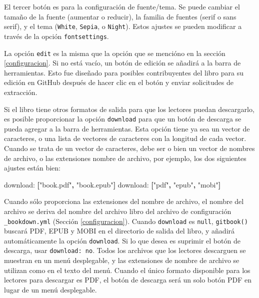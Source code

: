 \documentclass[12pt,]{krantz}
\makeatletter
\newenvironment{Shaded}{\begin{snugshade}}{\end{snugshade}}
\newcommand{\KeywordTok}[1]{\textcolor[rgb]{0.13,0.29,0.53}{\textbf{{#1}}}}
\newcommand{\StringTok}[1]{\textcolor[rgb]{0.31,0.60,0.02}{{#1}}}
\newcommand{\FunctionTok}[1]{\textcolor[rgb]{0.00,0.00,0.00}{{#1}}}
\newenvironment{kframe}{%
\medskip{}
\setlength{\fboxsep}{.8em}
 \def\at@end@of@kframe{}%
 \ifinner\ifhmode%
  \def\at@end@of@kframe{\end{minipage}}%
  \begin{minipage}{\columnwidth}%
 \fi\fi%
 \def\FrameCommand##1{\hskip\@totalleftmargin \hskip-\fboxsep
 \colorbox{shadecolor}{##1}\hskip-\fboxsep
     \hskip-\linewidth \hskip-\@totalleftmargin \hskip\columnwidth}%
 \MakeFramed {\advance\hsize-\width
   \@totalleftmargin\z@ \linewidth\hsize
   \@setminipage}}%
 {\par\unskip\endMakeFramed%
 \at@end@of@kframe}
\renewenvironment{Shaded}{\begin{kframe}}{\end{kframe}}
\theoremstyle{definition}
\theoremstyle{definition}
\theoremstyle{remark}
\makeatother
\begin{document}
El tercer botón es para la configuración de fuente/tema. Se puede
cambiar el tamaño de la fuente (aumentar o reducir), la familia de
fuentes (serif o sans serif), y el tema (\texttt{White}, \texttt{Sepia},
o \texttt{Night}). Estos ajustes se pueden modificar a través de la
opción \texttt{fontsettings}.

La opción \texttt{edit} es la misma que la opción que se mencióno en la
sección \ref{configuracion}. Si no está vacío, un botón de edición se
añadirá a la barra de herramientas. Esto fue diseñado para posibles
contribuyentes del libro para su edición en GitHub después de hacer clic
en el botón y enviar solicitudes de extracción.

Si el libro tiene otros formatos de salida para que los lectores puedan
descargarlo, es posible proporcionar la opción \texttt{download} para
que un botón de descarga se pueda agregar a la barra de herramientas.
Esta opción tiene ya sea un vector de caracteres, o una lista de
vectores de caracteres con la longitud de cada vector. Cuando se trata
de un vector de caracteres, debe ser o bien un vector de nombres de
archivo, o las extensiones nombre de archivo, por ejemplo, los dos
siguientes ajustes están bien:

\begin{Shaded}
\begin{Highlighting}[]
    \FunctionTok{download:} \KeywordTok{[}\StringTok{"book.pdf"}\KeywordTok{,} \StringTok{"book.epub"}\KeywordTok{]}
    \FunctionTok{download:} \KeywordTok{[}\StringTok{"pdf"}\KeywordTok{,} \StringTok{"epub"}\KeywordTok{,} \StringTok{"mobi"}\KeywordTok{]}
\end{Highlighting}
\end{Shaded}

Cuando sólo proporciona las extensiones del nombre de archivo, el nombre
del archivo se deriva del nombre del archivo libro del archivo de
configuración \texttt{\_bookdown.yml} (Sección \ref{configuracion}).
Cuando \texttt{download} es \texttt{null}, \texttt{gitbook()} buscará
PDF, EPUB y MOBI en el directorio de salida del libro, y añadirá
automáticamente la opción \texttt{download}. Si lo que desea es suprimir
el botón de descarga, usar \texttt{download:\ no}. Todos los archivos
que los lectores descarguen se muestran en un menú desplegable, y las
extensiones de nombre de archivo se utilizan como en el texto del menú.
Cuando el único formato disponible para los lectores para descargar es
PDF, el botón de descarga será un solo botón PDF en lugar de un menú
desplegable.
\end{document}
